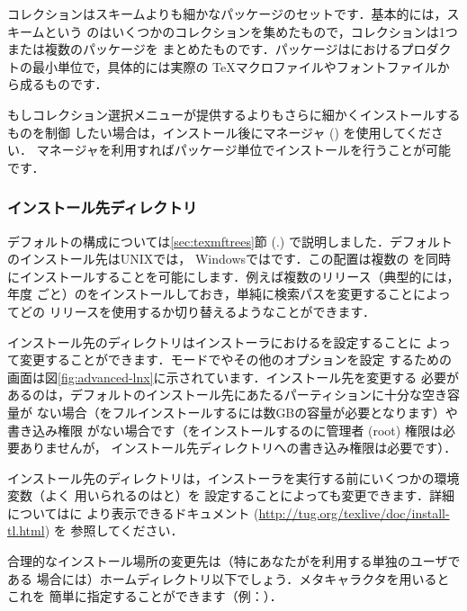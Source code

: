 \documentclass[uplatex,dvipdfmx]{jsarticle}
\begin{document}
コレクションはスキームよりも細かなパッケージのセットです．基本的には，スキームという
のはいくつかのコレクションを集めたもので，コレクションは1つまたは複数のパッケージを
まとめたものです．パッケージは\TL におけるプロダクトの最小単位で，具体的には実際の
\TeX マクロファイルやフォントファイルから成るものです．

もしコレクション選択メニューが提供するよりもさらに細かくインストールするものを制御
したい場合は，インストール後に\TL マネージャ () を使用してください．
\TL マネージャを利用すればパッケージ単位でインストールを行うことが可能です．

\subsubsection{インストール先ディレクトリ}
\label{sec:directories}

デフォルトの\TL 構成については\ref{sec:texmftrees}節 (\p.\pageref{sec:texmftrees})
で説明しました．デフォルトのインストール先はUNIXでは，
Windowsではです．この配置は複数の\TL
を同時にインストールすることを可能にします．例えば複数のリリース（典型的には，年度
ごと）の\TL をインストールしておき，単純に検索パスを変更することによってどの
リリースを使用するか切り替えるようなことができます．

インストール先のディレクトリはインストーラにおけるを設定することに
よって変更することができます．\GUI モードでやその他のオプションを設定
するための画面は図\ref{fig:advanced-lnx}に示されています．インストール先を変更する
必要があるのは，デフォルトのインストール先にあたるパーティションに十分な空き容量が
ない場合（\TL をフルインストールするには数GBの容量が必要となります）や書き込み権限
がない場合です（\TL をインストールするのに管理者 (root) 権限は必要ありませんが，
インストール先ディレクトリへの書き込み権限は必要です）．

インストール先のディレクトリは，インストーラを実行する前にいくつかの環境変数（よく
用いられるのはと）を
設定することによっても変更できます．詳細についてはに
より表示できるドキュメント (\url{http://tug.org/texlive/doc/install-tl.html}) を
参照してください．

合理的なインストール場所の変更先は（特にあなたが\TL を利用する単独のユーザである
場合には）ホームディレクトリ以下でしょう．メタキャラクタ\dir{~}を用いるとこれを
簡単に指定することができます（例：）．
\end{document}
